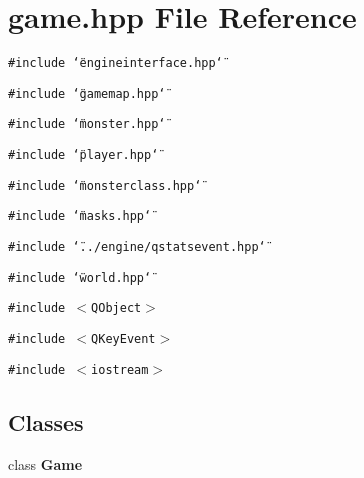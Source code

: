 \section{game.hpp File Reference}
\label{game_8hpp}
{\tt \#include \char`\"{}engineinterface.hpp\char`\"{}}\par
{\tt \#include \char`\"{}gamemap.hpp\char`\"{}}\par
{\tt \#include \char`\"{}monster.hpp\char`\"{}}\par
{\tt \#include \char`\"{}player.hpp\char`\"{}}\par
{\tt \#include \char`\"{}monsterclass.hpp\char`\"{}}\par
{\tt \#include \char`\"{}masks.hpp\char`\"{}}\par
{\tt \#include \char`\"{}../engine/qstatsevent.hpp\char`\"{}}\par
{\tt \#include \char`\"{}world.hpp\char`\"{}}\par
{\tt \#include $<$QObject$>$}\par
{\tt \#include $<$QKey\-Event$>$}\par
{\tt \#include $<$iostream$>$}\par
\subsection*{Classes}
\begin{CompactItemize}
\item 
class {\bf Game}
\end{CompactItemize}
